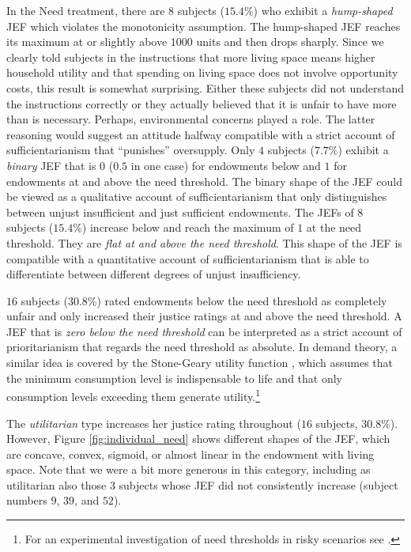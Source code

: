 \documentclass[12pt]{scrartcl}
\begin{document}
In the Need treatment, there are $8$ subjects ($15.4\%$) who exhibit a \textit{hump-shaped} JEF which violates the monotonicity assumption.
The hump-shaped JEF reaches its maximum at or slightly above $1000$ units and then drops sharply.
Since we clearly told subjects in the instructions that more living space means higher household utility and that spending on living space does not involve opportunity costs, this result is somewhat surprising.
Either these subjects did not understand the instructions correctly or they actually believed that it is unfair to have more than is necessary.
Perhaps, environmental concerns played a role.
The latter reasoning would suggest an attitude halfway compatible with a strict account of sufficientarianism that ``punishes'' oversupply.
Only $4$ subjects ($7.7\%$) exhibit a \textit{binary} JEF that is $0$ ($0.5$ in one case) for endowments below and $1$ for endowments at and above the need threshold.
The binary shape of the JEF could be viewed as a qualitative account of sufficientarianism that only distinguishes between unjust insufficient and just sufficient endowments.
The JEFs of $8$ subjects ($15.4\%$) increase below and reach the maximum of $1$ at the need threshold.
They are \textit{flat at and above the need threshold}.
This shape of the JEF is compatible with a quantitative account of sufficientarianism that is able to differentiate between different degrees of unjust insufficiency.

$16$ subjects ($30.8\%$) rated endowments below the need threshold as completely unfair and only increased their justice ratings at and above the need threshold.
A JEF that is \textit{zero below the need threshold} can be interpreted as a strict account of prioritarianism that regards the need threshold as absolute.
In demand theory, a similar idea is covered by the Stone-Geary utility function \citep{geary_note_1950,stone_linear_1954}, which assumes that the minimum consumption level is indispensable to life and that only consumption levels exceeding them generate utility.\footnote{For an experimental investigation of need thresholds in risky scenarios see \citet{diederich_need_2020}.}

The \textit{utilitarian} type increases her justice rating throughout ($16$ subjects, $30.8\%$).
However, Figure \ref{fig:individual_need} shows different shapes of the JEF, which are concave, convex, sigmoid, or almost linear in the endowment with living space.
Note that we were a bit more generous in this category, including as utilitarian also those $3$ subjects whose JEF did not consistently increase (subject numbers $9$, $39$, and $52$).
\end{document}
